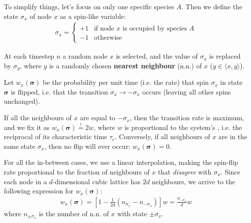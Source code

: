 \documentclass[../../main.tex]{subfiles}
\begin{document}
\medskip

To simplify things, let's focus on only one specific species $A$. Then we define the state $\sigma_x$ of node $x$ as a spin-like variable:
\begin{align*}
    \sigma_x = \begin{cases}
        +1 & \text{if node $x$ is occupied by species $A$}\\
        -1 & \text{otherwise}
    \end{cases}
\end{align*}

At each timestep $n$  a random node $x$ is selected, and the value of $\sigma_x$ is replaced by $\sigma_y$, where $y$ is a randomly chosen \textbf{nearest neighbour} (n.n.) of $x$ \hbox{($y \in \langle x,y \rangle$)}. 

\medskip

Let $w_x(\bm{\sigma})$ be the probability per unit time (i.e. the rate) that spin $\sigma_x$ in state $\bm{\sigma}$ is flipped, i.e. that the transition $\sigma_x \to -\sigma_x$ occurs (leaving all other spins unchanged). 

If all the neighbours of $x$ are equal to $-\sigma_x$, then the transition rate is maximum, and we fix it as $w_x(\bm{\sigma}) \overset{!}{=} 2w$, where $w$ is proportional to the system's , i.e. the reciprocal of its characteristic time $\tau_c$. Conversely, if all neighbours of $x$ are in the same state $\sigma_x$, then no flip will ever occur: $w_x(\bm{\sigma}) = 0$. 

For all the in-between cases, we use a linear interpolation, making the spin-flip rate proportional to the fraction of neighbours of $x$ that \textit{disagree} with $\sigma_x$. Since each node in a $d$-dimensional cubic lattice has $2d$ neighbours, we arrive to the following expression for $w_x(\bm{\sigma})$:
\begin{align}\label{eqn:spin-change1}
    w_x(\bm{\sigma}) = \left[1- \frac{1}{2d}(n_{\sigma_x} - n_{-\sigma_x}) \right] w = \frac{n_{-\sigma_x}}{d} w 
\end{align}
where $n_{\pm \sigma_x}$ is the number of n.n. of $x$ with state $\pm \sigma_x$.
\end{document}

